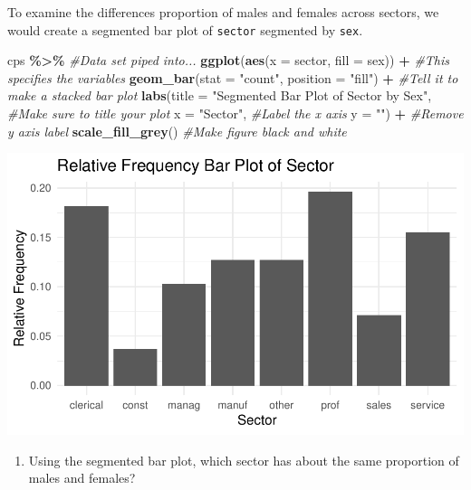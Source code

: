 \documentclass[
]{report}
\newenvironment{Shaded}{\begin{snugshade}}{\end{snugshade}}
\newcommand{\CommentTok}[1]{\textcolor[rgb]{0.56,0.35,0.01}{\textit{#1}}}
\newcommand{\DataTypeTok}[1]{\textcolor[rgb]{0.13,0.29,0.53}{#1}}
\newcommand{\KeywordTok}[1]{\textcolor[rgb]{0.13,0.29,0.53}{\textbf{#1}}}
\newcommand{\NormalTok}[1]{#1}
\newcommand{\OperatorTok}[1]{\textcolor[rgb]{0.81,0.36,0.00}{\textbf{#1}}}
\newcommand{\StringTok}[1]{\textcolor[rgb]{0.31,0.60,0.02}{#1}}
\providecommand{\tightlist}{%
  \setlength{\itemsep}{0pt}\setlength{\parskip}{0pt}}
\begin{document}
To examine the differences proportion of males and females across sectors, we would create a segmented bar plot of \texttt{sector} segmented by \texttt{sex}.

\begin{Shaded}
\begin{Highlighting}[]
\NormalTok{cps }\OperatorTok{\%\textgreater{}\%}\StringTok{ }\CommentTok{\#Data set piped into...}
\KeywordTok{ggplot}\NormalTok{(}\KeywordTok{aes}\NormalTok{(}\DataTypeTok{x =}\NormalTok{ sector, }\DataTypeTok{fill =}\NormalTok{ sex)) }\OperatorTok{+}\StringTok{   }\CommentTok{\#This specifies the variables}
\StringTok{  }\KeywordTok{geom\_bar}\NormalTok{(}\DataTypeTok{stat =} \StringTok{"count"}\NormalTok{, }\DataTypeTok{position =} \StringTok{"fill"}\NormalTok{) }\OperatorTok{+}\StringTok{  }\CommentTok{\#Tell it to make a stacked bar plot}
\StringTok{  }\KeywordTok{labs}\NormalTok{(}\DataTypeTok{title =} \StringTok{"Segmented Bar Plot of Sector by Sex"}\NormalTok{,  }\CommentTok{\#Make sure to title your plot }
       \DataTypeTok{x =} \StringTok{"Sector"}\NormalTok{,   }\CommentTok{\#Label the x axis}
       \DataTypeTok{y =} \StringTok{""}\NormalTok{) }\OperatorTok{+}\StringTok{  }\CommentTok{\#Remove y axis label}
\StringTok{    }\KeywordTok{scale\_fill\_grey}\NormalTok{()  }\CommentTok{\#Make figure black and white}
\end{Highlighting}
\end{Shaded}

\begin{center}\includegraphics[width=0.6\linewidth]{03-EDA-categorical_files/figure-latex/unnamed-chunk-4-1} \end{center}

\begin{enumerate}
\def\labelenumi{\arabic{enumi}.}
\setcounter{enumi}{5}
\tightlist
\item
  Using the segmented bar plot, which sector has about the same proportion of males and females?
\end{enumerate}
\end{document}
